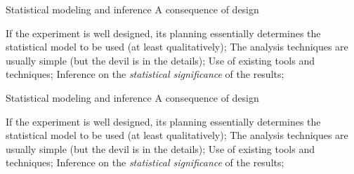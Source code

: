 \documentclass[t]{beamer}
\begin{document}
\begin{ftst}
{Statistical modeling and inference}
{A consequence of design}
If the experiment is well designed, its planning essentially determines the statistical model to be used (at least qualitatively);
\vone
The analysis techniques are usually simple (but the devil is in the details);
\vone
Use of existing tools and techniques;
\vone
Inference on the \textit{statistical significance} of the results;

\end{ftst}


\begin{ftst}
{Statistical modeling and inference}
{A consequence of design}
If the experiment is well designed, its planning essentially determines the statistical model to be used (at least qualitatively);
\vone
The analysis techniques are usually simple (but the devil is in the details);
\vone
Use of existing tools and techniques;
\vone
Inference on the \textit{statistical significance} of the results;

\end{ftst}

\end{document}
